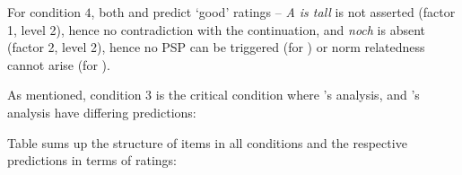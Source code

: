 \documentclass[output=paper
,modfonts
,nonflat]{langsci/langscibook}
\begin{document}
For condition $4$, both \citeauthor{Hofstetter2013} and \citeauthor{umbach2009a_comp} predict `good' ratings -- \textit{A is tall} is not asserted (factor 1, level 2), hence no contradiction with the continuation, and \textit{noch} is absent (factor 2, level 2), hence no PSP can be triggered (for \citeauthor{Hofstetter2013}) or norm relatedness cannot arise (for \citeauthor{umbach2009a_comp}).

As mentioned, condition 3 is the critical condition where \citeauthor{Hofstetter2013}'s \citeyearpar{Hofstetter2013} analysis, and \citeauthor{umbach2009a_comp}'s \citeyearpar{umbach2009a_comp} analysis have differing predictions:

Table  sums up the structure of items in all conditions and the respective predictions in terms of ratings:
\end{document}
